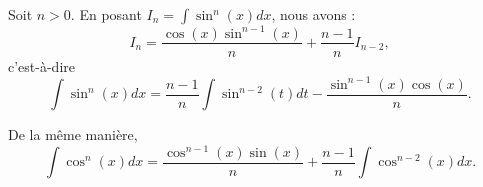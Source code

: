 \begin{lemma}     \label{LEMooMGUVooIIQSmC}
	Soit \( n>0\). En posant \( I_n=\int\sin^n(x)dx\), nous avons :
	\begin{equation}
		I_n=\frac{ \cos(x)\sin^{n-1}(x) }{ n }+\frac{ n-1 }{ n }I_{n-2},
	\end{equation}
	c'est-à-dire
	\begin{equation}
		\int\sin^n(x)dx=\frac{ n-1 }{ n }\int\sin^{n-2}(t)dt-\frac{ \sin^{n-1}(x)\cos(x) }{ n }.
	\end{equation}

	De la même manière,
	\begin{equation}        \label{EQooWJMIooSgBbJx}
		\int\cos^n(x)dx=\frac{ \cos^{n-1}(x)\sin(x) }{ n }+\frac{ n-1 }{ n }\int\cos^{n-2}(x)dx.
	\end{equation}
\end{lemma}

